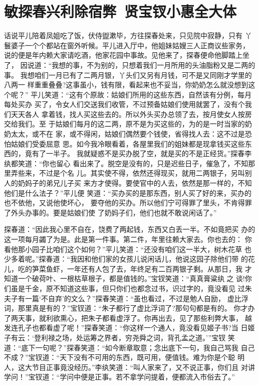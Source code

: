 \chapter{敏探春兴利除宿弊~贤宝钗小惠全大体}

话说平儿陪着凤姐吃了饭，伏侍盥漱毕，方往探春处来，只见院中寂静，只有
丫鬟婆子一个个都站在窗外听候。平儿进入厅中，他姐妹姑嫂三人正商议些家务，
说的便是年内赖大家请吃酒，他家花园中事故。见他来了，探春便命他脚踏上坐了，
因说道：“我想的事，不为别的，只想着我们一月所用的头油脂粉又是二两的事。
我想咱们一月已有了二两月银，丫头们又另有月钱，可不是又同刚才学里的八两一
样重重叠叠?这事虽小，钱有限，看起来也不妥当，你奶奶怎么就没想到这个呢？”
平儿笑道：“这有个原故：姑娘们所用的这些东西，自然该有分例，每月每处买办
买了，令女人们交送我们收管，不过预备姑娘们使用就罢了，没有个我们天天各人
拿着钱，找人买这些去的。所以外头买办总领了去，按月使女人按房交给我们。至
于姑娘们每月的这二两，原不是为买这些的，为的是一时当家的奶奶太太，或不在
家，或不得闲，姑娘们偶然要个钱使，省得找人去：这不过是恐怕姑娘们受委屈意
思。如今我冷眼看着，各屋里我们的姐妹都是现拿钱买这些东西的，竟有了一半子。
我就疑惑不是买办脱了空，就是买的不是正经货。”探春李纨都笑道：“你也留心
看出来了。脱空是没有的，只是迟些日子，催急了，不知那里弄些来，不过是个名
儿。其实使不得，依然还得现买，就用二两银子，另叫别人的奶妈子的弟兄儿子买
来方才使得。要使官中的人去，依然是那一样的，不知他们是什么法子？”平儿便
笑道：“买办买的是那东西，别人买了好的来，买办的也不依他，又说他使坏心，
要夺他的买办。所以他们宁可得罪了里头，不肯得罪了外头办事的。要是姑娘们使
了奶妈子们，他们也就不敢说闲话了。”

探春道：“因此我心里不自在，饶费了两起钱，东西又白丢一半。不如竟把买
办的这一项每月蠲了为是。此是第一件事。第二件，年里往赖大家去。你也去的：
你看他那小园子比咱们这个如何？”平儿笑道：“还没有咱们这一半大，树木花草
也少多着呢。”探春道：“我因和他们家的女孩儿说闲话儿，他说这园子除他们带
的花儿，吃的笋菜鱼虾，一年还有人包了去，年终足有二百两银子剩。从那日，我
才知道一个破荷叶、一根枯草根子，都是值钱的。”宝钗笑道：“真真膏粱纨之
谈!你们虽是千金，原不知道这些事，但只你们也都念过书，识过字的，竟没看见
过朱夫子有一篇‘不自弃’的文么？”探春笑道：“虽也看过，不过是勉人自励，
虚比浮词，那里真是有的？”宝钗道：“朱子都行了虚比浮词了?那句句都是有的。
你才办了两天事，就利欲熏心，把朱子都看虚浮了。你再出去，见了那些利弊大事，
越发连孔子也都看虚了呢！”探春笑道：“你这样一个通人，竟没看见姬子书?当
日姬子有云：‘登利禄之场，处运筹之界者，穷尧舜之词，背孔孟之道。’”宝钗
笑道：“底下一句呢？”探春笑道：“如今断章取意；念出底下一句，我自己骂我
自己不成？”宝钗道：“天下没有不可用的东西，既可用，便值钱。难为你是个聪
明人，这大节目正事竟没经历。”李纨笑道：“叫人家来了，又不说正事，你们且
对讲学问！”宝钗道：“学问中便是正事。若不拿学问提着，便都流入市俗去了。”

